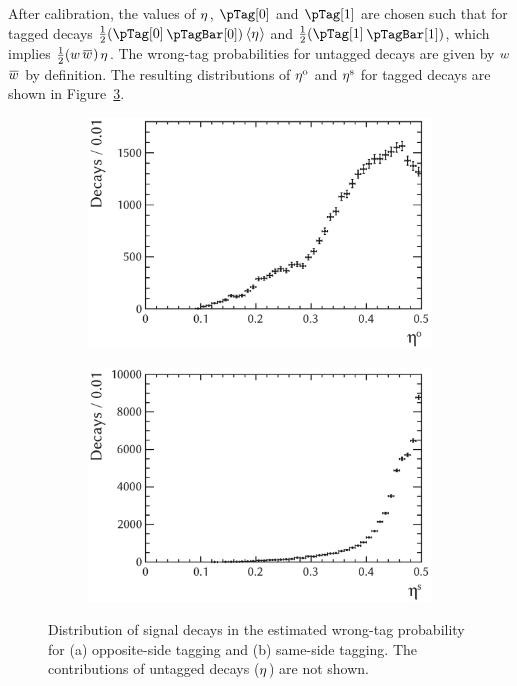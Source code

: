 After calibration, the values of $\eta^{}$, $\pTag[0]$ and $\pTag[1]$ are chosen such that for tagged decays
$\tfrac{1}{2}(\pTag[0]$\textplus$\pTagBar[0])$\texteq$\langle\eta^{}\rangle$ and $\tfrac{1}{2}(\pTag[1]$\textplus$\pTagBar[1])$,
which implies $\tfrac{1}{2}(w^{}$\textplus$\wTagBar)$\texteq$\eta^{}$. The wrong-tag probabilities for untagged decays are given by
$w^{}$\textequiv$\wTagBar$ by definition. The resulting distributions of $\eta^{\text{o}}$ and $\eta^{\text{s}}$ for tagged decays are shown in
Figure~\ref{fig:etaDists}. 
\begin{figure}[htbp]
  \centering
  \begin{subfigure}{0.49\textwidth}
    \includegraphics[width=\textwidth]{graphics/analysis/etaOS}
    \caption{}
    \label{fig:etaOS}
  \end{subfigure}%
  \hfill%
  \begin{subfigure}{0.49\textwidth}
    \includegraphics[width=\textwidth]{graphics/analysis/etaSS}
    \caption{}
    \label{fig:etaSS}
  \end{subfigure}
  \caption{Distribution of \BstoJpsiKK{} signal decays in the estimated wrong-tag probability
           for (a) opposite-side tagging and (b) same-side tagging.
           The contributions of untagged decays ($\eta^{}$) are not shown.}
  \label{fig:etaDists}
\end{figure}

